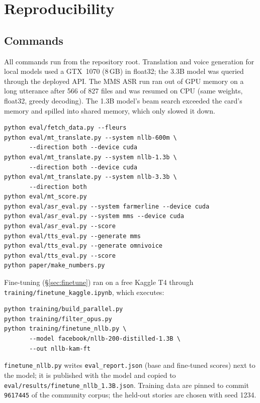 \section{Reproducibility}
\label{app:repro}

\subsection{Commands}
All commands run from the repository root. Translation and voice generation for local models used a GTX~1070 (8\,GB) in float32; the 3.3B model was queried through the deployed API. The MMS ASR run ran out of GPU memory on a long utterance after 566 of 827 files and was resumed on CPU (same weights, float32, greedy decoding). The 1.3B model's beam search exceeded the card's memory and spilled into shared memory, which only slowed it down.

\begin{small}
\begin{verbatim}
python eval/fetch_data.py --fleurs
python eval/mt_translate.py --system nllb-600m \
       --direction both --device cuda
python eval/mt_translate.py --system nllb-1.3b \
       --direction both --device cuda
python eval/mt_translate.py --system nllb-3.3b \
       --direction both
python eval/mt_score.py
python eval/asr_eval.py --system farmerline --device cuda
python eval/asr_eval.py --system mms --device cuda
python eval/asr_eval.py --score
python eval/tts_eval.py --generate mms
python eval/tts_eval.py --generate omnivoice
python eval/tts_eval.py --score
python paper/make_numbers.py
\end{verbatim}
\end{small}

Fine-tuning (\S\ref{sec:finetune}) ran on a free Kaggle T4 through \texttt{training/finetune\_kaggle.ipynb}, which executes:

\begin{small}
\begin{verbatim}
python training/build_parallel.py
python training/filter_opus.py
python training/finetune_nllb.py \
       --model facebook/nllb-200-distilled-1.3B \
       --out nllb-kam-ft
\end{verbatim}
\end{small}

\texttt{finetune\_nllb.py} writes \texttt{eval\_report.json} (base and fine-tuned scores) next to the model; it is published with the model and copied to \texttt{eval/results/finetune\_nllb\_1.3B.json}. Training data are pinned to commit \texttt{9617445} of the community corpus; the held-out stories are chosen with seed 1234.

